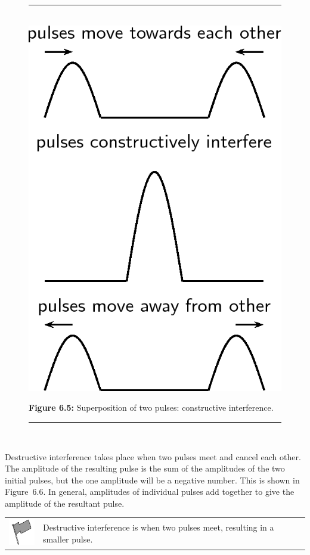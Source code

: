 	\begin{figure}[H] %
    \begin{center}
    \rule[.1in]{\figurerulewidth}{.005in} \\
        \label{m38802*uid53!!!underscore!!!media}\label{m38802*uid53!!!underscore!!!printimage}\includegraphics[width=0.3\columnwidth]{col11305.imgs/m38802_PG10C4_018.png} %
        
      \vspace{2pt}
    \vspace{\rubberspace}\par \begin{cnxcaption}
	  \small \textbf{Figure 6.5: }Superposition of two pulses: constructive interference.
	\end{cnxcaption}
      
    \vspace{.1in}
    \rule[.1in]{\figurerulewidth}{.005in} \\
        
    \end{center}

 \end{figure}   

    \addtocounter{footnote}{-0}
    
      \label{m38802*id316190}Destructive interference takes place when two pulses meet and cancel each other. The amplitude of the resulting pulse is the sum of the amplitudes of the two initial pulses, but the one amplitude will be a negative number. This is shown in Figure~6.6. In general, amplitudes of individual pulses add together to give the amplitude of the resultant pulse.\par 
\label{m38802*fhsst!!!underscore!!!id578}\begin{definition}
	  \begin{tabular*}{15 cm}{m{15 mm}m{}}
	\hspace*{-50pt}  \includegraphics[width=0.5in]{col11305.imgs/psflag2.png}   & \Definition{   \label{id2436357}\textbf{ Destructive interference}} { \label{m38802*meaningfhsst!!!underscore!!!id578}
      Destructive interference is when two pulses meet, resulting in a smaller pulse. 
       } 
      \end{tabular*}
      \end{definition}

